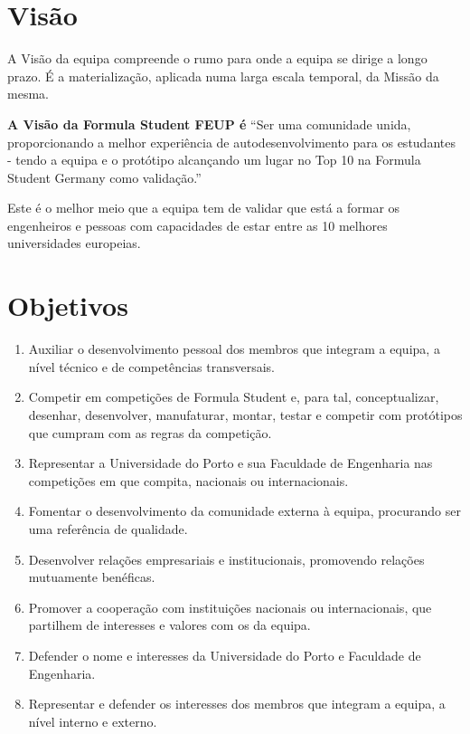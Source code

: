 \section{Visão}
A Visão da equipa compreende o rumo para onde a equipa se dirige a longo prazo. É a materialização, aplicada numa larga escala temporal, da Missão da mesma.

\textbf{A Visão da Formula Student FEUP é} ``Ser uma comunidade unida, proporcionando a melhor experiência de autodesenvolvimento para os estudantes - tendo a equipa e o protótipo alcançando um lugar no Top 10 na Formula Student Germany como validação.''

Este é o melhor meio que a equipa tem de validar que está a formar os engenheiros e pessoas com capacidades de estar entre as 10 melhores universidades europeias.

\section{Objetivos}
\begin{enumerate}
  \item Auxiliar o desenvolvimento pessoal dos membros que integram a equipa, a nível técnico e de competências transversais.
  \item Competir em competições de Formula Student e, para tal, conceptualizar, desenhar, desenvolver, manufaturar, montar, testar e competir com protótipos que cumpram com as regras da competição.
  \item Representar a Universidade do Porto e sua Faculdade de Engenharia nas competições em que compita, nacionais ou internacionais.
  \item Fomentar o desenvolvimento da comunidade externa à equipa, procurando ser uma referência de qualidade.
  \item Desenvolver relações empresariais e institucionais, promovendo relações mutuamente benéficas.
  \item Promover a cooperação com instituições nacionais ou internacionais, que partilhem de interesses e valores com os da equipa.
  \item Defender o nome e interesses da Universidade do Porto e Faculdade de Engenharia.
  \item Representar e defender os interesses dos membros que integram a equipa, a nível interno e externo.
\end{enumerate}

